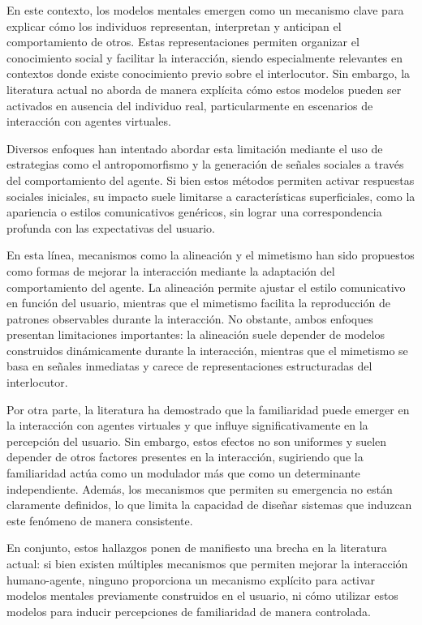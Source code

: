 \documentclass[12pt]{article}
\begin{document}
En este contexto, los modelos mentales emergen como un mecanismo clave para explicar cómo los individuos representan, interpretan y anticipan el comportamiento de otros. Estas representaciones permiten organizar el conocimiento social y facilitar la interacción, siendo especialmente relevantes en contextos donde existe conocimiento previo sobre el interlocutor. Sin embargo, la literatura actual no aborda de manera explícita cómo estos modelos pueden ser activados en ausencia del individuo real, particularmente en escenarios de interacción con agentes virtuales.

Diversos enfoques han intentado abordar esta limitación mediante el uso de estrategias como el antropomorfismo y la generación de señales sociales a través del comportamiento del agente. Si bien estos métodos permiten activar respuestas sociales iniciales, su impacto suele limitarse a características superficiales, como la apariencia o estilos comunicativos genéricos, sin lograr una correspondencia profunda con las expectativas del usuario.

En esta línea, mecanismos como la alineación y el mimetismo han sido propuestos como formas de mejorar la interacción mediante la adaptación del comportamiento del agente. La alineación permite ajustar el estilo comunicativo en función del usuario, mientras que el mimetismo facilita la reproducción de patrones observables durante la interacción. No obstante, ambos enfoques presentan limitaciones importantes: la alineación suele depender de modelos construidos dinámicamente durante la interacción, mientras que el mimetismo se basa en señales inmediatas y carece de representaciones estructuradas del interlocutor.

Por otra parte, la literatura ha demostrado que la familiaridad puede emerger en la interacción con agentes virtuales y que influye significativamente en la percepción del usuario. Sin embargo, estos efectos no son uniformes y suelen depender de otros factores presentes en la interacción, sugiriendo que la familiaridad actúa como un modulador más que como un determinante independiente. Además, los mecanismos que permiten su emergencia no están claramente definidos, lo que limita la capacidad de diseñar sistemas que induzcan este fenómeno de manera consistente.

En conjunto, estos hallazgos ponen de manifiesto una brecha en la literatura actual: si bien existen múltiples mecanismos que permiten mejorar la interacción humano-agente, ninguno proporciona un mecanismo explícito para activar modelos mentales previamente construidos en el usuario, ni cómo utilizar estos modelos para inducir percepciones de familiaridad de manera controlada.
\end{document}
